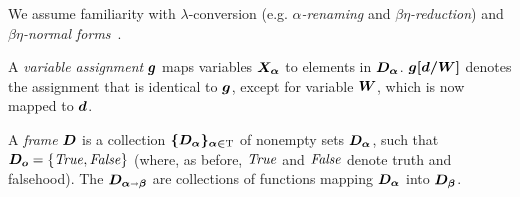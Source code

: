 We assume familiarity with $\lambda$-conversion (e.g. \emph{$\alpha$-renaming} and
\emph{$\beta\eta$-reduction}) and \emph{$\beta\eta$-normal forms}~\cite{barendregt13book}.






A \emph{variable assignment} $\boldsymbol{g}$ maps
variables $\boldsymbol{X_\alpha}$ to elements in $\boldsymbol{D_\alpha}$. $\boldsymbol{g[d/W]}$ denotes the
assignment that is identical to $\boldsymbol{g}$, except for variable $\boldsymbol{W}$, which is
now mapped to $\boldsymbol{d}$.

\begin{defn}\label{homlframe}
A \emph{frame} $\boldsymbol{D}$ is a collection $\boldsymbol{\{D_\alpha\}_{\alpha\in\text{\textrm{T}}}}$
of nonempty sets $\boldsymbol{D_\alpha}$, such that $\boldsymbol{D_o} = \{\mathit{True},\mathit{False}\}$
(where, as before, $\mathit{True}$ and $\mathit{False}$ denote truth and falsehood).  The
$\boldsymbol{D_{\alpha\shortrightarrow\beta}}$ are collections of functions mapping
$\boldsymbol{D_\alpha}$ into $\boldsymbol{D_\beta}$. 
\end{defn}





